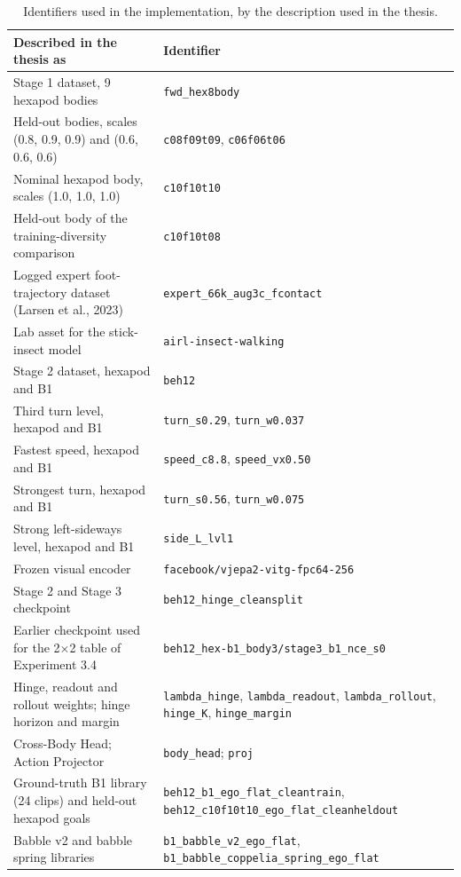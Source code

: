\documentclass[12pt,a4paper,oneside]{report}
\begin{document}
\begin{table}[H]
\centering
\footnotesize
\setlength{\tabcolsep}{4pt}
\caption{Identifiers used in the implementation, by the description used in the thesis.}
\label{tab:appendix-ids}
\begin{tabularx}{\textwidth}{>{\hsize}Y>{\hsize}Y}
\toprule
\textbf{Described in the thesis as} & \textbf{Identifier}\\
\midrule
Stage 1 dataset, 9 hexapod bodies & \texttt{fwd\_hex8body}\\
\addlinespace[3pt]
Held-out bodies, scales (0.8, 0.9, 0.9) and (0.6, 0.6, 0.6) & \texttt{c08f09t09}, \texttt{c06f06t06}\\
\addlinespace[3pt]
Nominal hexapod body, scales (1.0, 1.0, 1.0) & \texttt{c10f10t10}\\
\addlinespace[3pt]
Held-out body of the training-diversity comparison & \texttt{c10f10t08}\\
\addlinespace[3pt]
Logged expert foot-trajectory dataset (Larsen et al., 2023) & \texttt{expert\_66k\_aug3c\_fcontact}\\
\addlinespace[3pt]
Lab asset for the stick-insect model & \texttt{airl-insect-walking}\\
\addlinespace[3pt]
Stage 2 dataset, hexapod and B1 & \texttt{beh12}\\
\addlinespace[3pt]
Third turn level, hexapod and B1 & \texttt{turn\_s0.29}, \texttt{turn\_w0.037}\\
\addlinespace[3pt]
Fastest speed, hexapod and B1 & \texttt{speed\_c8.8}, \texttt{speed\_vx0.50}\\
\addlinespace[3pt]
Strongest turn, hexapod and B1 & \texttt{turn\_s0.56}, \texttt{turn\_w0.075}\\
\addlinespace[3pt]
Strong left-sideways level, hexapod and B1 & \texttt{side\_L\_lvl1}\\
\addlinespace[3pt]
Frozen visual encoder & \texttt{facebook/vjepa2-vitg-fpc64-256}\\
\addlinespace[3pt]
Stage 2 and Stage 3 checkpoint & \texttt{beh12\_hinge\_cleansplit}\\
\addlinespace[3pt]
Earlier checkpoint used for the 2$\times$2 table of Experiment 3.4 & \texttt{beh12\_hex-b1\_body3/stage3\_b1\_nce\_s0}\\
\addlinespace[3pt]
Hinge, readout and rollout weights; hinge horizon and margin & \texttt{lambda\_hinge}, \texttt{lambda\_readout}, \texttt{lambda\_rollout}, \texttt{hinge\_K}, \texttt{hinge\_margin}\\
\addlinespace[3pt]
Cross-Body Head; Action Projector & \texttt{body\_head}; \texttt{proj}\\
\addlinespace[3pt]
Ground-truth B1 library (24 clips) and held-out hexapod goals & \texttt{beh12\_b1\_ego\_flat\_cleantrain}, \texttt{beh12\_c10f10t10\_ego\_flat\_cleanheldout}\\
\addlinespace[3pt]
Babble v2 and babble spring libraries & \texttt{b1\_babble\_v2\_ego\_flat}, \texttt{b1\_babble\_coppelia\_spring\_ego\_flat}\\
\bottomrule
\end{tabularx}
\end{table}
\end{document}
